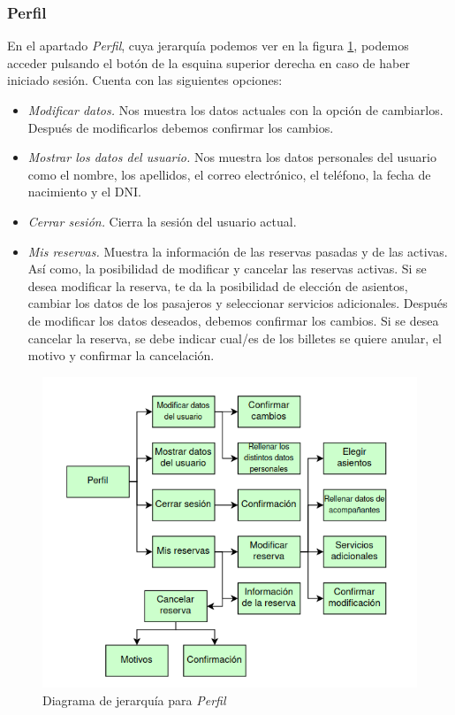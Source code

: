 \subsubsection{Perfil}

En el apartado \textit{Perfil}, cuya jerarquía podemos ver en la figura \ref{fig:jerarquias2},
podemos acceder pulsando el botón de la esquina superior derecha en caso de haber iniciado sesión. Cuenta
con las siguientes opciones:

\begin{itemize}
      \item \textit{Modificar datos.} Nos muestra los datos actuales con la opción de cambiarlos. Después
            de modificarlos debemos confirmar los cambios.
      \item \textit{Mostrar los datos del usuario.} Nos muestra los datos personales del usuario como
            el nombre, los apellidos, el correo electrónico, el teléfono, la fecha de nacimiento
            y el DNI.
      \item \textit{Cerrar sesión.} Cierra la sesión del usuario actual.
      \item \textit{Mis reservas.} Muestra la información de las reservas pasadas y de las activas. Así
            como, la posibilidad de modificar y cancelar las reservas activas. Si se desea
            modificar la reserva, te da la posibilidad de elección de asientos, cambiar los datos
            de los pasajeros y seleccionar servicios adicionales. Después de modificar los datos
            deseados, debemos confirmar los cambios. Si se desea cancelar la reserva, se debe
            indicar cual/es de los billetes se quiere anular, el motivo y confirmar la cancelación.
\end{itemize}

\begin{figure}
      \centering
      \includegraphics[width=0.8\linewidth]{./Imagenes/jerarquia-perfil.png}
      \caption{Diagrama de jerarquía para \textit{Perfil}}
      \label{fig:jerarquias2}
\end{figure}

